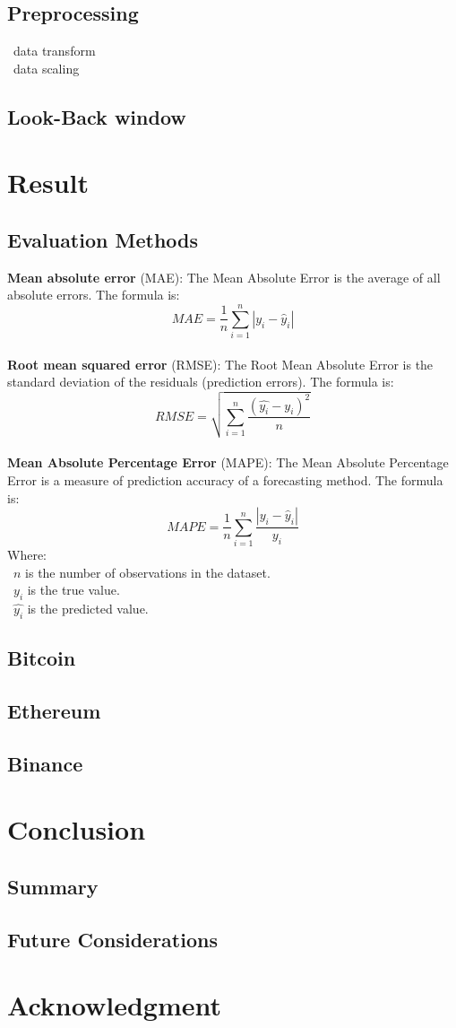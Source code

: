 \documentclass{ieeeojies}
\begin{document}
 \subsection{Preprocessing}
 \textbullet\ data transform \\
 \textbullet\ data scaling
 \subsection{Look-Back window}
\section{Result}

\subsection{Evaluation Methods}
\textbf{Mean absolute error} (MAE): 
The Mean Absolute Error is the average of all absolute errors. The formula is:\\
\[MAE = \frac{1}{n} \sum_{i=1}^{n} | y_i - \hat{y}_i |\]\\
  
\textbf{Root mean squared error} (RMSE): The Root Mean Absolute Error is the standard deviation of the residuals (prediction errors). The formula is: \\
\[RMSE=\sqrt{\sum_{i=1}^{n} \frac{(\hat{y_i}-y_i )^2}{n} }\]\\
\textbf{Mean Absolute Percentage Error} (MAPE): The Mean Absolute Percentage Error is a measure of prediction accuracy of a forecasting method. The formula is:  \\
\[MAPE=\frac{1}{n}\sum_{i=1}^{n} \frac{|y_i-\hat{y}_i|}{y_i}\]
Where: \\
	\indent\textbullet\ \(n\) is the number of observations in the dataset.\\
	\indent\textbullet\ \(y_i\)  is the true value.\\
	\indent\textbullet\ \(\hat{y_i}\) is the predicted value.
 \subsection{Bitcoin}
\subsection{Ethereum}
\subsection{Binance}
\section{Conclusion}
\subsection{Summary}

\subsection{Future Considerations}

\section*{Acknowledgment}
\nocite{*}


\EOD
\end{document}
